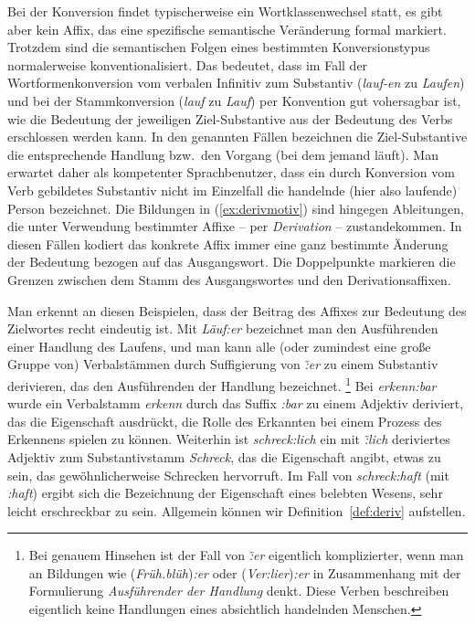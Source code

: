 Bei der Konversion findet typischerweise ein Wortklassenwechsel statt, es gibt aber kein Affix, das eine spezifische semantische Veränderung formal markiert.
Trotzdem sind die semantischen Folgen eines bestimmten Konversionstypus normalerweise konventionalisiert. 
Das bedeutet, dass \zB im Fall der Wortformenkonversion vom verbalen Infinitiv zum Substantiv (\textit{lauf-en} zu \textit{Laufen}) und bei der Stammkonversion (\textit{lauf} zu \textit{Lauf}) per Konvention gut vohersagbar ist, wie die Bedeutung der jeweiligen Ziel-Substantive aus der Bedeutung des Verbs erschlossen werden kann.
In den genannten Fällen bezeichnen die Ziel-Substantive die entsprechende Handlung bzw.\ den Vorgang (bei dem jemand läuft).
Man erwartet daher als kompetenter Sprachbenutzer, dass ein durch Konversion vom Verb gebildetes Substantiv \zB nicht im Einzelfall die handelnde (hier also laufende) Person bezeichnet.
Die Bildungen in (\ref{ex:derivmotiv}) sind hingegen Ableitungen, die unter Verwendung bestimmter Affixe -- per \textit{Derivation} -- zustandekommen.
In diesen Fällen kodiert das konkrete Affix immer eine ganz bestimmte Änderung der Bedeutung bezogen auf das Ausgangswort.
Die Doppelpunkte markieren die Grenzen zwischen dem Stamm des Ausgangswortes und den Derivationsaffixen.

\begin{exe}
  \ex\label{ex:derivmotiv}
  \begin{xlist}
  \end{xlist}
\end{exe}

Man erkennt an diesen Beispielen, dass der Beitrag des Affixes zur Bedeutung des Zielwortes recht eindeutig ist.
Mit \textit{Läuf:er} bezeichnet man den Ausführenden einer Handlung des Laufens, und man kann alle (oder zumindest eine große Gruppe von) Verbalstämmen durch Suffigierung von \textit{\~:er} zu einem Substantiv derivieren, das den Ausführenden der Handlung bezeichnet.%
\footnote{Bei genauem Hinsehen ist der Fall von \textit{\~:er} eigentlich komplizierter, wenn man an Bildungen wie (\textit{Früh.blüh})\textit{:er} oder (\textit{Ver:lier})\textit{:er} in Zusammenhang mit der Formulierung \textit{Ausführender der Handlung} denkt.
Diese Verben beschreiben eigentlich keine Handlungen eines absichtlich handelnden Menschen.}
Bei \textit{erkenn:bar} wurde ein Verbalstamm \textit{erkenn} durch das Suffix \textit{:bar} zu einem Adjektiv deriviert, das die Eigenschaft ausdrückt, die Rolle des Erkannten bei einem Prozess des Erkennens spielen zu können.
Weiterhin ist \textit{schreck:lich} ein mit \textit{\~:lich} deriviertes Adjektiv zum Substantivstamm \textit{Schreck}, das die Eigenschaft angibt, etwas zu sein, das gewöhnlicherweise Schrecken hervorruft.
Im Fall von \textit{schreck:haft} (mit \textit{:haft}) ergibt sich die Bezeichnung der Eigenschaft eines belebten Wesens, sehr leicht erschreckbar zu sein.
Allgemein können wir Definition~\ref{def:deriv} aufstellen.


